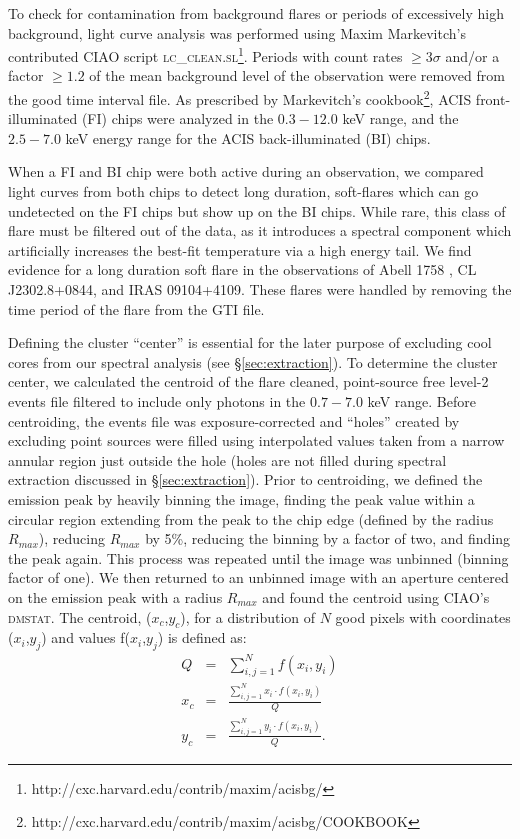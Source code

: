 \documentclass[12pt,preprint]{aastex}
\begin{document}
To check for contamination from background flares or periods of
excessively high background, light curve analysis was performed using
Maxim Markevitch's contributed {\textsc{CIAO}} script
{\textsc{lc\_clean.sl}}\footnote{http://cxc.harvard.edu/contrib/maxim/acisbg/}.
Periods with count rates $\geq 3\sigma$ and/or a factor $\geq 1.2$ of
the mean background level of the observation were removed from the
good time interval file. As prescribed by Markevitch's
cookbook\footnote{http://cxc.harvard.edu/contrib/maxim/acisbg/COOKBOOK},
ACIS front-illuminated (FI) chips were analyzed in the $0.3-12.0$ keV
range, and the $2.5-7.0$ keV energy range for the ACIS
back-illuminated (BI) chips.

When a FI and BI chip were both active during an observation, we
compared light curves from both chips to detect long duration,
soft-flares which can go undetected on the FI chips but show up on the
BI chips. While rare, this class of flare must be filtered out of the
data, as it introduces a spectral component which artificially
increases the best-fit temperature via a high energy tail. We find
evidence for a long duration soft flare in the observations of Abell
1758 \citep{2004ApJ...613..831D}, CL J2302.8+0844, and IRAS
09104+4109. These flares were handled by removing the time period of
the flare from the GTI file.

Defining the cluster ``center'' is essential for the later purpose of
excluding cool cores from our spectral analysis (see
\S\ref{sec:extraction}). To determine the cluster center, we
calculated the centroid of the flare cleaned, point-source
free level-2 events file filtered to include only photons in the
$0.7-7.0$ keV range. Before centroiding, the events file was
exposure-corrected and ``holes'' created by excluding point sources
were filled using interpolated values taken from a narrow annular region just
outside the hole (holes are not filled during spectral extraction
discussed in \S\ref{sec:extraction}). Prior to centroiding, we defined
the emission peak by heavily binning the image, finding the peak value
within a circular region extending from the peak to the chip edge
(defined by the radius $R_{max}$), reducing $R_{max}$ by 5\%,
reducing the binning by a factor of two, and finding the peak
again. This process was repeated until the image was unbinned (binning
factor of one). We then returned to an unbinned image with an aperture
centered on the emission peak with a radius $R_{max}$ and found the
centroid using {\textsc{CIAO}}'s {\textsc{dmstat}}. The centroid, ($x_c$,$y_c$),
for a distribution of $N$ good pixels with coordinates ($x_i$,$y_j$)
and values f($x_i$,$y_j$) is defined as:
\begin{eqnarray}
Q &=& \sum_{i,j=1}^N f(x_i,y_i) \\
x_c &=& \frac{\sum_{i,j=1}^N x_i \cdot f(x_i,y_i)}{Q} \nonumber \\
y_c &=& \frac{\sum_{i,j=1}^N y_i \cdot f(x_i,y_i)}{Q}. \nonumber
\end{eqnarray}
\end{document}
